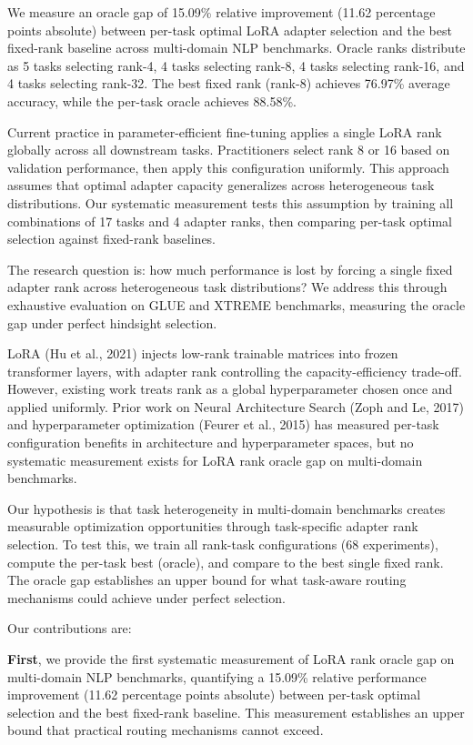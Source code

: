 
We measure an oracle gap of 15.09\% relative improvement (11.62 percentage points absolute) between per-task optimal LoRA adapter selection and the best fixed-rank baseline across multi-domain NLP benchmarks. Oracle ranks distribute as 5 tasks selecting rank-4, 4 tasks selecting rank-8, 4 tasks selecting rank-16, and 4 tasks selecting rank-32. The best fixed rank (rank-8) achieves 76.97\% average accuracy, while the per-task oracle achieves 88.58\%.

Current practice in parameter-efficient fine-tuning applies a single LoRA rank globally across all downstream tasks. Practitioners select rank 8 or 16 based on validation performance, then apply this configuration uniformly. This approach assumes that optimal adapter capacity generalizes across heterogeneous task distributions. Our systematic measurement tests this assumption by training all combinations of 17 tasks and 4 adapter ranks, then comparing per-task optimal selection against fixed-rank baselines.

The research question is: how much performance is lost by forcing a single fixed adapter rank across heterogeneous task distributions? We address this through exhaustive evaluation on GLUE and XTREME benchmarks, measuring the oracle gap under perfect hindsight selection.

LoRA (Hu et al., 2021) injects low-rank trainable matrices into frozen transformer layers, with adapter rank controlling the capacity-efficiency trade-off. However, existing work treats rank as a global hyperparameter chosen once and applied uniformly. Prior work on Neural Architecture Search (Zoph and Le, 2017) and hyperparameter optimization (Feurer et al., 2015) has measured per-task configuration benefits in architecture and hyperparameter spaces, but no systematic measurement exists for LoRA rank oracle gap on multi-domain benchmarks.

Our hypothesis is that task heterogeneity in multi-domain benchmarks creates measurable optimization opportunities through task-specific adapter rank selection. To test this, we train all rank-task configurations (68 experiments), compute the per-task best (oracle), and compare to the best single fixed rank. The oracle gap establishes an upper bound for what task-aware routing mechanisms could achieve under perfect selection.

Our contributions are:

\textbf{First}, we provide the first systematic measurement of LoRA rank oracle gap on multi-domain NLP benchmarks, quantifying a 15.09\% relative performance improvement (11.62 percentage points absolute) between per-task optimal selection and the best fixed-rank baseline. This measurement establishes an upper bound that practical routing mechanisms cannot exceed.

